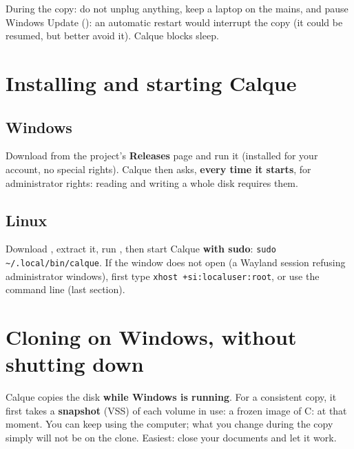 During the copy: do not unplug anything, keep a laptop on the mains, and pause Windows Update
(): an automatic restart would interrupt the copy (it could be
resumed, but better avoid it). Calque blocks sleep.

\section{Installing and starting Calque}

\subsection*{Windows}
Download  from the project's \textbf{Releases} page and run it (installed for
your account, no special rights). Calque then asks, \textbf{every time it starts}, for administrator
rights: reading and writing a whole disk requires them.

\subsection*{Linux}
Download , extract it, run , then start Calque
\textbf{with sudo}: \texttt{sudo \textasciitilde/.local/bin/calque}. If the window does not open (a
Wayland session refusing administrator windows), first type \texttt{xhost +si:localuser:root}, or use
the command line (last section).

\section{Cloning on Windows, without shutting down}\label{sec:windows}

Calque copies the disk \textbf{while Windows is running}. For a consistent copy, it first takes a
\textbf{snapshot} (VSS) of each volume in use: a frozen image of C: at that moment. You can keep using
the computer; what you change during the copy simply will not be on the clone. Easiest: close your
documents and let it work.


